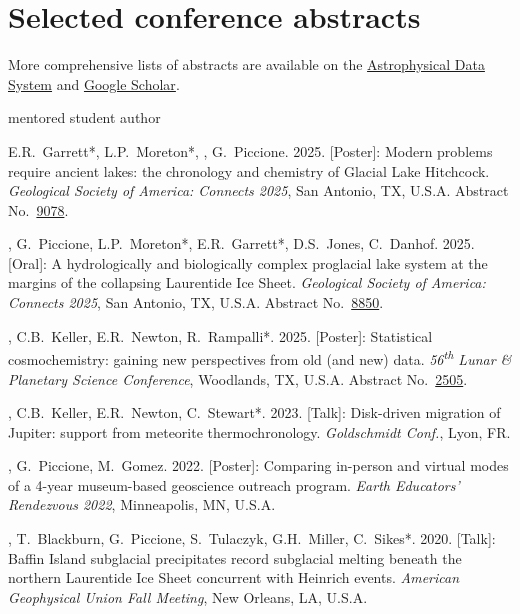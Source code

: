 \section{Selected conference abstracts}

More comprehensive lists of abstracts are available on the \href{https://ui.adsabs.harvard.edu/search/q=author%3A%22Edwards%2C%20Graham%20Harper%22}{Astrophysical Data System} and \href{https://scholar.google.com/citations?user=KHLOvgcAAAAJ&hl=en}{Google Scholar}.

\hfill* mentored student author

\begin{etaremune}[leftmargin=3ex]
  
  \item E.R.~Garrett*, L.P.~Moreton*, \ghedwards, G.~Piccione. 2025. [Poster]: Modern problems require ancient lakes: the chronology and chemistry of Glacial Lake Hitchcock. \textit{Geological Society of America: Connects 2025}, San Antonio, TX, U.S.A. Abstract No.~\href{https://doi.org/10.1130/abs/2025AM-9078}{9078}.
  
  \item \ghedwards, G.~Piccione, L.P.~Moreton*, E.R.~Garrett*, D.S.~Jones, C.~Danhof. 2025. [Oral]: A hydrologically and biologically complex proglacial lake system at the margins of the collapsing Laurentide Ice Sheet. \textit{Geological Society of America: Connects 2025}, San Antonio, TX, U.S.A. Abstract No.~\href{https://doi.org/10.1130/abs/2025AM-8850}{8850}.

  \item \ghedwards, C.B.~Keller, E.R.~Newton, R.~Rampalli*. 2025. [Poster]: Statistical cosmochemistry: gaining new perspectives from old (and new) data. \textit{56\textsuperscript{th} Lunar \& Planetary Science Conference}, Woodlands, TX, U.S.A. Abstract No.~\href{https://www.hou.usra.edu/meetings/lpsc2025/pdf/2505.pdf}{2505}.

  \item \ghedwards, C.B.~Keller, E.R.~Newton, C.~Stewart*. 2023. [Talk]: Disk-driven migration of Jupiter: support from meteorite thermochronology. \textit{Goldschmidt Conf.}, Lyon, FR. 

  \item \ghedwards, G.~Piccione, M.~Gomez. 2022. [Poster]: Comparing in-person and virtual modes of a 4-year museum-based geoscience outreach program. \textit{Earth Educators' Rendezvous 2022}, Minneapolis, MN, U.S.A.

  \item \ghedwards, T.~Blackburn, G.~Piccione, S.~Tulaczyk, G.H.~Miller, C.~Sikes*. 2020. [Talk]: Baffin Island subglacial precipitates record subglacial melting beneath the northern Laurentide Ice Sheet concurrent with Heinrich events. \textit{American Geophysical Union Fall Meeting}, New Orleans, LA, U.S.A.


\end{etaremune}
